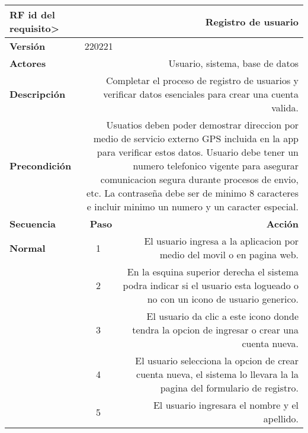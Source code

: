 \documentclass[conference]{IEEEtran}
\begin{document}
\vspace{-0.2cm}
\begin{table}[H]
  \centering
  \begin{adjustbox}{width=0.45\textwidth}
    \begin{tabular}{|p{11.215em}|r|r|}
    \toprule
    \textbf{RF id del requisito>} & \multicolumn{2}{p{37.43em}|}{\textbf{Registro de usuario}} \\
    \midrule
    \textbf{Versión} & \multicolumn{2}{l|}{220221} \\
    \midrule
    \textbf{Actores} & \multicolumn{2}{p{37.43em}|}{Usuario, sistema, base de datos} \\
    \midrule
    \textbf{Descripción} & \multicolumn{2}{p{37.43em}|}{Completar el proceso de registro de usuarios y verificar datos esenciales para crear una cuenta valida.} \\
    \midrule
    \textbf{Precondición} & \multicolumn{2}{p{37.43em}|}{Usuatios deben poder demostrar direccion por medio de servicio externo GPS incluida en la app para verificar estos datos. Usuario debe tener un numero telefonico vigente para asegurar comunicacion segura durante procesos de envio, etc. La contraseña debe ser de minimo 8 caracteres e incluir minimo un numero y un caracter especial.} \\
    \midrule
    \textbf{Secuencia} & \textbf{Paso} & \multicolumn{1}{p{32em}|}{\textbf{Acción}} \\
    \midrule
    \textbf{Normal} & \multicolumn{1}{c|}{1} & \multicolumn{1}{p{32em}|}{El usuario ingresa a la aplicacion por medio del movil o en pagina web.} \\
    \midrule
    \multicolumn{1}{|r|}{} & \multicolumn{1}{c|}{2} & \multicolumn{1}{p{32em}|}{En la esquina superior derecha el sistema podra indicar si el usuario esta logueado o no con un icono de usuario generico.} \\
    \midrule
    \multicolumn{1}{|r|}{} & \multicolumn{1}{c|}{3} & \multicolumn{1}{p{32em}|}{El usuario da clic a este icono donde tendra la opcion de ingresar o crear una cuenta nueva.} \\
    \midrule
    \multicolumn{1}{|r|}{} & \multicolumn{1}{c|}{4} & \multicolumn{1}{p{32em}|}{El usuario selecciona la opcion de crear cuenta nueva, el sistema lo llevara la la pagina del formulario de registro.} \\
    \midrule
    \multicolumn{1}{|r|}{} & \multicolumn{1}{c|}{5} & \multicolumn{1}{p{32em}|}{El usuario ingresara el nombre y el apellido.} \\

\end{tabular}
\end{adjustbox}
\end{table}
\end{document}
